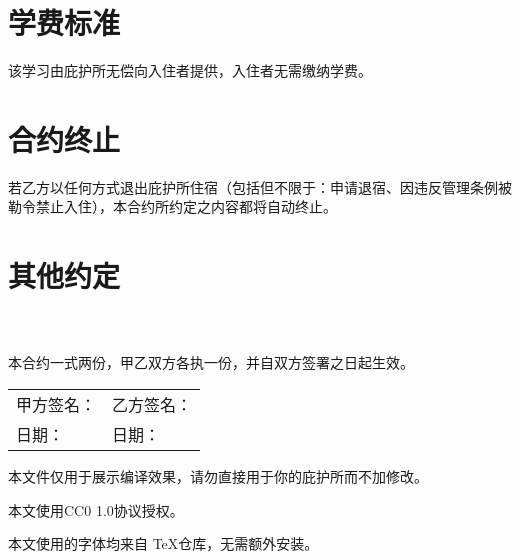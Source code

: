 \documentclass[12pt]{article}
\begin{document}
	\section{学费标准}
		该学习由庇护所无偿向入住者提供，入住者无需缴纳学费。
	\section{合约终止}
		若乙方以任何方式退出庇护所住宿（包括但不限于：申请退宿、因违反管理条例被勒令禁止入住），本合约所约定之内容都将自动终止。
	\section{其他约定}
	\noindent\underline{\hspace{15cm}}\\
	\underline{\hspace{15cm}}\\
	
	\vspace{2em}
	\noindent 本合约一式两份，甲乙双方各执一份，并自双方签署之日起生效。
	
	\vspace{3em}
	\begin{tabular}{p{7cm}p{7cm}}
		甲方签名：\underline{\hspace{10em}} & 乙方签名：\underline{\hspace{10em}} \\
		日期：\underline{\hspace{12em}} & 日期：\underline{\hspace{12em}} \\
	\end{tabular}
	\newpage
	本文件仅用于展示编译效果，请勿直接用于你的庇护所而不加修改。

	本文使用CC0 1.0协议授权。

	本文使用的字体均来自 \TeX 仓库，无需额外安装。
\end{document}
